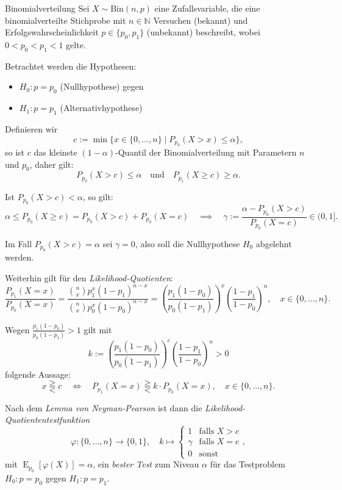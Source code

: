 \begin{example}{Binomialverteilung}
    Sei $X \sim \text{Bin}(n, p)$ eine Zufallsvariable, die eine binomialverteilte Stichprobe mit $n \in \mathbb{N}$ Versuchen (bekannt) und Erfolgswahrscheinlichkeit $p \in \{ p_0, p_1 \}$ (unbekannt) beschreibt, wobei $0 < p_0 < p_1 < 1$ gelte.

    Betrachtet werden die Hypothesen:
    \begin{itemize}
        \item $H_0: p = p_0$ (Nullhypothese) gegen
        \item $H_1: p = p_1$ (Alternativhypothese)
    \end{itemize}

    Definieren wir
    \[
        c := \min \{ x \in \{ 0, \ldots, n \} \mid P_{p_0}(X > x) \leq \alpha \},
    \]
    so ist $c$ das kleinste $(1 - \alpha)$-Quantil der Binomialverteilung mit Parametern $n$ und $p_0$, daher gilt:
    \[
        P_{p_0}(X > c) \leq \alpha \quad \text{und} \quad P_{p_1}(X \geq c) \geq \alpha.
    \]

    Ist $P_{p_0}(X > c) < \alpha$, so gilt:
    \[
        \alpha \leq P_{p_0}(X \geq c) = P_{p_0}(X > c) + P_{p_0}(X = c) \quad \implies \quad \gamma := \frac{\alpha - P_{p_0}(X > c)}{P_{p_0}(X = c)} \in (0, 1].
    \]

    Im Fall $P_{p_0}(X > c) = \alpha$ sei $\gamma = 0$, also soll die Nullhypothese $H_0$ abgelehnt werden.

    Weiterhin gilt für den \emph{Likelihood-Quotienten}:
    \[
        \frac{P_{p_1}(X = x)}{P_{p_0}(X = x)} = \frac{\binom{n}{x} p_1^x (1 - p_1)^{n - x}}{\binom{n}{x} p_0^x (1 - p_0)^{n - x}} = \left( \frac{p_1(1 - p_0)}{p_0(1 - p_1)} \right)^x \left( \frac{1 - p_1}{1 - p_0} \right)^n, \quad x \in \{ 0, \ldots, n \}.
    \]

    Wegen $\frac{p_1(1 - p_0)}{p_0(1 - p_1)} > 1$ gilt mit
    \[
        k := \left( \frac{p_1(1 - p_0)}{p_0(1 - p_1)} \right)^c \left( \frac{1 - p_1}{1 - p_0} \right)^n > 0
    \]
    folgende Aussage:
    \[
        x \gtreqqless c \quad \iff \quad P_{p_1}(X = x) \gtreqqless k \cdot P_{p_0}(X = x), \quad x \in \{ 0, \ldots, n \}.
    \]


    Nach dem \emph{Lemma von Neyman-Pearson} ist dann die \emph{Likelihood-Quotiententestfunktion}
    \[
        \varphi: \{ 0, \ldots, n \} \to \{ 0, 1 \}, \quad k \mapsto \begin{cases}
            1      & \text{falls } X > c \\
            \gamma & \text{falls } X = c \\
            0      & \text{sonst}
        \end{cases},
    \]
    mit $\operatorname{E}_{p_0}[\varphi(X)] = \alpha$, ein \emph{bester Test} zum Niveau $\alpha$ für das Testproblem $H_0: p = p_0$ gegen $H_1: p = p_1$.
\end{example}


